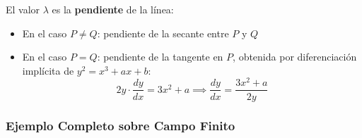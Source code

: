 \documentclass[11pt,a4paper,twoside,openright]{book}
\theoremstyle{definition}
\theoremstyle{plain}
\theoremstyle{remark}
\begin{document}
\begin{mathnote}
El valor $\lambda$ es la \textbf{pendiente} de la línea:
\begin{itemize}
    \item En el caso $P \neq Q$: pendiente de la secante entre $P$ y $Q$
    \item En el caso $P = Q$: pendiente de la tangente en $P$, obtenida por diferenciación implícita de $y^2 = x^3 + ax + b$:
    \[
    2y \cdot \frac{dy}{dx} = 3x^2 + a \implies \frac{dy}{dx} = \frac{3x^2 + a}{2y}
    \]
\end{itemize}
\end{mathnote}

\subsubsection{Ejemplo Completo sobre Campo Finito}
\end{document}
